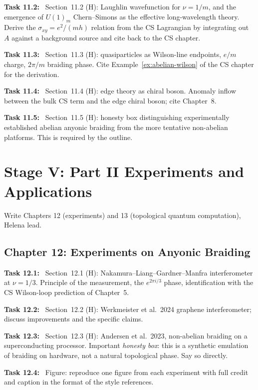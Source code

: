 \documentclass[11pt]{article}
\newcommand{\task}[1]{\medskip\noindent\textbf{Task #1:}\ }
\begin{document}
\task{11.2} Section~11.2 (H): Laughlin wavefunction for $\nu = 1/m$, and the emergence
of $U(1)_m$ Chern--Simons as the effective long-wavelength theory. Derive the
$\sigma_{xy} = e^2/(mh)$ relation from the CS Lagrangian by integrating out $A$ against
a background source and cite back to the CS chapter.

\task{11.3} Section~11.3 (H): quasiparticles as Wilson-line endpoints, $e/m$ charge,
$2\pi/m$ braiding phase. Cite Example~\ref{ex:abelian-wilson} of the CS chapter for
the derivation.

\task{11.4} Section~11.4 (H): edge theory as chiral boson. Anomaly inflow between the
bulk CS term and the edge chiral boson; cite Chapter~8.

\task{11.5} Section~11.5 (H): honesty box distinguishing experimentally established
abelian anyonic braiding from the more tentative non-abelian platforms. This is
required by the outline.

\section{Stage V: Part II Experiments and Applications}\label{sec:stageV}

\begin{goalbox}[Objective]
Write Chapters 12 (experiments) and 13 (topological quantum computation), Helena lead.
\end{goalbox}

\subsection{Chapter 12: Experiments on Anyonic Braiding}

\task{12.1} Section~12.1 (H): Nakamura--Liang--Gardner--Manfra \cite{Nakamura2020}
interferometer at $\nu=1/3$. Principle of the measurement, the $e^{2\pi i/3}$ phase,
identification with the CS Wilson-loop prediction of Chapter~5.

\task{12.2} Section~12.2 (H): Werkmeister et al.\ 2024 graphene interferometer; discuss
improvements and the specific claims.

\task{12.3} Section~12.3 (H): Andersen et al.\ 2023, non-abelian braiding on a
superconducting processor. Important \emph{honesty box}: this is a synthetic
emulation of braiding on hardware, not a natural topological phase. Say so directly.

\task{12.4} Figure: reproduce one figure from each experiment with full credit and
caption in the format of the style references.
\end{document}
